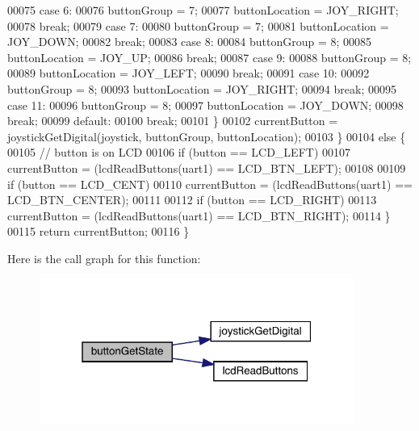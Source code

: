 \begin{DoxyCode}
00075         \textcolor{keywordflow}{case} 6:
00076             buttonGroup = 7;
00077             buttonLocation = JOY_RIGHT;
00078             \textcolor{keywordflow}{break};
00079         \textcolor{keywordflow}{case} 7:
00080             buttonGroup = 7;
00081             buttonLocation = JOY_DOWN;
00082             \textcolor{keywordflow}{break};
00083         \textcolor{keywordflow}{case} 8:
00084             buttonGroup = 8;
00085             buttonLocation = JOY_UP;
00086             \textcolor{keywordflow}{break};
00087         \textcolor{keywordflow}{case} 9:
00088             buttonGroup = 8;
00089             buttonLocation = JOY_LEFT;
00090             \textcolor{keywordflow}{break};
00091         \textcolor{keywordflow}{case} 10:
00092             buttonGroup = 8;
00093             buttonLocation = JOY_RIGHT;
00094             \textcolor{keywordflow}{break};
00095         \textcolor{keywordflow}{case} 11:
00096             buttonGroup = 8;
00097             buttonLocation = JOY_DOWN;
00098             \textcolor{keywordflow}{break};
00099         \textcolor{keywordflow}{default}:
00100             \textcolor{keywordflow}{break};
00101         \}
00102         currentButton = joystickGetDigital(joystick, buttonGroup, buttonLocation);
00103     \}
00104     \textcolor{keywordflow}{else} \{
00105         \textcolor{comment}{// button is on LCD}
00106         \textcolor{keywordflow}{if} (button == LCD_LEFT)
00107             currentButton = (lcdReadButtons(uart1) == LCD_BTN_LEFT);
00108 
00109         \textcolor{keywordflow}{if} (button == LCD_CENT)
00110             currentButton = (lcdReadButtons(uart1) == LCD_BTN_CENTER);
00111 
00112         \textcolor{keywordflow}{if} (button == LCD_RIGHT)
00113             currentButton = (lcdReadButtons(uart1) == LCD_BTN_RIGHT);
00114     \}
00115     \textcolor{keywordflow}{return} currentButton;
00116 \}
\end{DoxyCode}
Here is the call graph for this function\+:\nopagebreak
\begin{figure}[H]
\begin{center}
\leavevmode
\includegraphics[width=292pt]{toggle_8h_a72989c21af9d14672f6e59c44a2b59bc_cgraph}
\end{center}
\end{figure}
